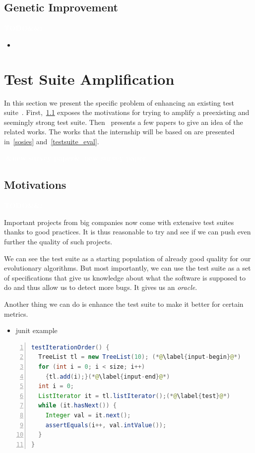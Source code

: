\documentclass[11pt]{sdm}
\newcommand{\addref}[1]{\colorbox{TealBlue!100}{\textcolor{white}{\textbf{$[$\ifx&#1&\ \else#1\fi$]$}}}}
\newcommand{\todo}[1]{\colorbox{Red!75}{\textcolor{white}{\textbf{TODO\ifx&#1&\else: #1\fi}}}}
\begin{document}
\subsection{Genetic Improvement}
\label{applications}
\todo{}

\begin{itemize}
  \item
\end{itemize}

\cite{petke2017genetic}



\section{Test Suite Amplification}
\label{tsa}
In this section we present the specific problem of enhancing an existing test suite~\cite{danglot2017emerging}.
First,~\ref{motiv_tsa} exposes the motivations for trying to amplify a preexisting and seemingly strong test suite.
Then~ presents a few papers to give an idea of the related works.
The works that the internship will be based on are presented in~\ref{sosies} and~\ref{testsuite_eval}.

\addref{new survey paper}

\subsection{Motivations}
\label{motiv_tsa}
\todo{}

Important projects from big companies now come with extensive test suites thanks to good practices.
It is thus reasonable to try and see if we can push even further the quality of such projects.

We can see the test suite as a starting population of already good quality for our evolutionary algorithms.
But most importantly, we can use the test suite as a set of specifications that give us knowledge about what the software is supposed to do and thus allow us to detect more bugs.
It gives us an \textit{oracle}.

Another thing we can do is enhance the test suite to make it better for certain metrics.

\begin{itemize}
  \item junit example
\end{itemize}

\begin{lstlisting}[caption={An archetypal example of an object-oriented test case  (taken from the Apache Commons Collections, in the class TreeListTest, line 270)},label=lst:archetype,float,language=java,numbers=left]
testIterationOrder() {
  TreeList tl = new TreeList(10); (*@\label{input-begin}@*)
  for (int i = 0; i < size; i++)
    {tl.add(i);}(*@\label{input-end}@*)
  int i = 0;
  ListIterator it = tl.listIterator();(*@\label{test}@*)
  while (it.hasNext()) {
    Integer val = it.next();
    assertEquals(i++, val.intValue());
  }
}
\end{lstlisting}
\end{document}

